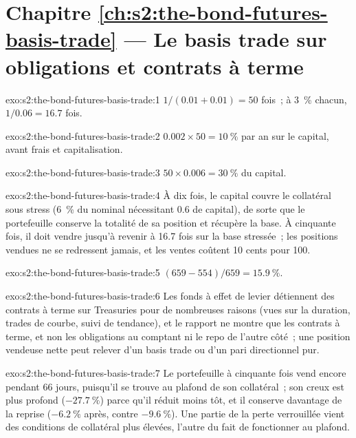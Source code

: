 \section*{Chapitre \ref{ch:s2:the-bond-futures-basis-trade} --- Le basis trade sur obligations et contrats à terme}

\begin{solution}{exo:s2:the-bond-futures-basis-trade:1}
$1/(0.01 + 0.01) = 50$ fois~; à 3~\% chacun, $1/0.06 = 16.7$ fois.
\end{solution}

\begin{solution}{exo:s2:the-bond-futures-basis-trade:2}
$0.002 \times 50 = 10~\%$ par an sur le capital, avant frais et capitalisation.
\end{solution}

\begin{solution}{exo:s2:the-bond-futures-basis-trade:3}
$50 \times 0.006 = 30~\%$ du capital.
\end{solution}

\begin{solution}{exo:s2:the-bond-futures-basis-trade:4}
À dix fois, le capital couvre le collatéral sous stress (6~\% du nominal nécessitant 0.6 de capital), de sorte que le portefeuille conserve la totalité de sa position et récupère la base.
À cinquante fois, il doit vendre jusqu'à revenir à 16.7 fois sur la base stressée~; les positions vendues ne se redressent jamais, et les ventes coûtent 10 cents pour 100.
\end{solution}

\begin{solution}{exo:s2:the-bond-futures-basis-trade:5}
$(659 - 554)/659 = 15.9~\%$.
\end{solution}

\begin{solution}{exo:s2:the-bond-futures-basis-trade:6}
Les fonds à effet de levier détiennent des contrats à terme sur Treasuries pour de nombreuses raisons (vues sur la duration, trades de courbe, suivi de tendance), et le rapport ne montre que les contrats à terme,
et non les obligations au comptant ni le repo de l'autre côté~; une position vendeuse nette peut relever d'un basis trade ou d'un pari directionnel pur.
\end{solution}

\begin{solution}{exo:s2:the-bond-futures-basis-trade:7}
Le portefeuille à cinquante fois vend encore pendant 66 jours, puisqu'il se trouve au plafond de son collatéral~; son creux est plus profond ($-27.7~\%$) parce qu'il réduit moins tôt, et il
conserve davantage de la reprise ($-6.2~\%$ après, contre $-9.6~\%$). Une partie de la perte verrouillée vient des conditions de collatéral plus élevées,
l'autre du fait de fonctionner au plafond.
\end{solution}

